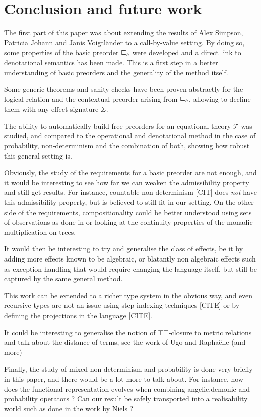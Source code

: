 \section{Conclusion and future work}

The first part of this paper was about extending the results 
of Alex Simpson, Patricia Johann and Janis Voigtländer \cite{gom}
to a call-by-value setting. By doing so, some properties of 
the basic preorder $\sqsubseteq_b$ were developed and a direct link
to denotational semantics has been made. This is a first step 
in a better understanding of basic preorders and the generality 
of the method itself. 

Some generic theorems and sanity checks have been proven 
abstractly for the logical relation and the contextual preorder
arising from $\sqsubseteq_b$, allowing to decline them with any 
effect signature $\Sigma$. 

The ability to automatically build free preorders for an equational 
theory $\mathcal{T}$ was studied, and compared to the operational 
and denotational method in the case of probability, non-determinism
and the combination of both, showing how robust this general setting 
is.

\vspace{1em}

Obviously, the study of the requirements for a basic preorder 
are not enough, and it would be interesting to see how far we 
can weaken the admissibility property and still get results.
For instance, countable non-determinism [CIT] does \emph{not} have 
this admissibility property, but is believed to still fit in 
our setting. On the other side of the requirements, compositionality 
could be better understood using sets of observations as done in 
\cite{gom} or looking at the continuity properties of the 
monadic multiplication on trees.

It would then be interesting to try and generalise the class of 
effects, be it by adding more effects known to be algebraic, 
or blatantly non algebraic effects such as exception handling 
that would require changing the language itself, but still 
be captured by the same general method.

This work can be extended to a richer type system in the obvious 
way, and even recursive types are not an issue using step-indexing 
techniques [CITE] or by defining the projections in the language [CITE].

It could be interesting to generalise the notion of $\top\top$-closure 
to metric relations 
and talk about the distance of terms, see the work of Ugo and Raphaëlle
(and more)

Finally, the study of mixed non-determinism and probability is 
done very briefly in this paper, and there would be a lot more 
to talk about. For instance, how does the functional representation 
evolves when combining angelic,demonic and probability operators ?
Can our result be safely transported into a realisability world 
such as done in the work by Niels ?
